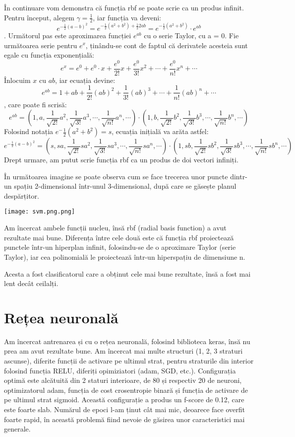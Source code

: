 În continuare vom demonstra că funcția rbf se poate scrie ca un produs infinit. Pentru început, alegem \(\gamma = \frac{1}{2}\), iar funcția va deveni:
\[e^{-\frac{1}{2} (a - b) ^ {2}} = e^{-\frac{1}{2}(a^2 + b^2) + \frac{1}{2}2ab} = e^{-\frac{1}{2}(a^2 + b^2)} \cdot e^{ab}\] .
Următorul pas este aproximarea funcției \(e^{ab}\) cu o serie Taylor, cu a = 0. Fie următoarea serie pentru \(e^x\), ținându-se cont de faptul că derivatele acesteia sunt egale cu funcția exponențială:
\[e^x = e^0 + e^0 \cdot x + \frac{e^0}{2!}x + \frac{e^0}{3!}x^2 + \dotsb + \frac{e^0}{n!}x^n + \dotsb\]
Înlocuim \(x\) cu \(ab\), iar ecuația devine:
\[e^{ab} = 1 + ab + \frac{1}{2!}(ab)^2 + \frac{1}{3!}(ab)^3 + \dotsb + \frac{1}{n!}(ab)^n + \dotsb\], care poate fi scrisă:
\[e^{ab} = (1, a, \frac{1}{\sqrt{2!}}a^2, \frac{1}{\sqrt{3!}}a^3, \dotsb, \frac{1}{\sqrt{n!}}a^n, \dotsb) \cdot (1, b, \frac{1}{\sqrt{2!}}b^2, \frac{1}{\sqrt{3!}}b^3, \dotsb, \frac{1}{\sqrt{n!}}b^n, \dotsb)\]
Folosind notația \(e^-\frac{1}{2}(a^2 + b^2) = s\), ecuația inițială va arăta astfel:
\[e^{-\frac{1}{2} (a - b) ^ {2}} = (s, sa, \frac{1}{\sqrt{2!}}sa^2, \frac{1}{\sqrt{3!}}sa^3, \dotsb, \frac{1}{\sqrt{n!}}sa^n, \dotsb) \cdot (1, sb, \frac{1}{\sqrt{2!}}sb^2, \frac{1}{\sqrt{3!}}sb^3, \dotsb, \frac{1}{\sqrt{n!}}sb^n, \dotsb)\]
Drept urmare, am putut scrie funcția rbf ca un produs de doi vectori infiniți.

În următoarea imagine se poate observa cum se face trecerea unor puncte dintr-un spațiu 2-dimensional într-unul 3-dimensional, după care
se găsește planul despărțitor.

\texttt{[image: svm.png.png]}


Am încercat ambele funcții nucleu, însă rbf (radial basis function) a avut rezultate mai bune. Diferența între cele două este că
funcția rbf proiectează punctele într-un hiperplan infinit, folosindu-se de o aproximare Taylor (serie Taylor), iar cea polinomială 
le proiectează într-un hiperspațiu de dimensiune n.


Acesta a fost clasificatorul care a obținut cele mai bune rezultate, însă a fost mai lent decât ceilalți.


\section{Rețea neuronală}

Am încercat antrenarea și cu o rețea neuronală, folosind biblioteca keras, însă nu prea am avut rezultate bune. Am încercat mai multe
structuri (1, 2, 3 straturi ascunse), diferite funcții de activare pe ultimul strat, pentru straturile din interior folosind funcția RELU,
diferiți opimiziatori (adam, SGD, etc.). Configurația optimă este alcătuită din 2 staturi interioare, de 80 și respectiv 20 de neuroni, optimizatorul adam,
funcția de cost crosentropie binară și funcția de activare de pe ultimul strat sigmoid. Această configurație a produs un f-score de 0.12, care
este foarte slab. Numărul de epoci l-am ținut cât mai mic, deoarece face overfit foarte rapid, în această problemă fiind nevoie de găsirea unor 
caracteristici mai generale.

